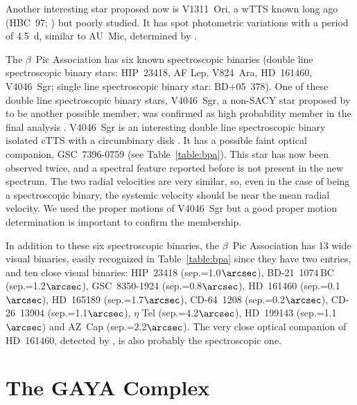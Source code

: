 \documentclass[11pt,twoside]{book}
\begin{document}
Another interesting star proposed now is V1311~Ori, a wTTS known long ago (HBC~97; \citep{hbc})
but poorly studied. It has spot photometric variations with a period of 4.5~d, similar
to AU~Mic, determined by \citet{gahm95}.

The $\beta$~Pic Association has six known spectroscopic binaries
(double line spectroscopic binary stars: HIP~23418, AF Lep,
V824~Ara, HD~161460, V4046~Sgr; single line spectroscopic binary star:
BD+05~378).  One of these double line spectroscopic binary stars,
V4046~Sgr, a non-SACY star proposed by \citet{torres03a, torres03} to
be another possible member, was confirmed as high probability member
in the final analysis \citep{torres06}.  V4046~Sgr is an interesting
double line spectroscopic binary isolated cTTS with a circumbinary
disk \citep{quast00, stempels04}.  It has a possible faint optical
companion, GSC~7396-0759 (see Table~\ref{table:bpa}).  This star has
now been observed twice, and a spectral feature reported before
\citep{torres06} is not present in the new spectrum.  The two radial
velocities are very similar, so, even in the case of being a
spectroscopic binary, the systemic velocity should be near the mean
radial velocity.  We used the proper motions of V4046~Sgr but a good
proper motion determination is important to confirm the membership.

In addition to these six spectroscopic binaries, the $\beta$~Pic
Association has 13 wide visual binaries, easily recognized in
Table~\ref{table:bpa} since they have two entries, and ten close
visual binaries: HIP~23418 (sep.=1.0$\arcsec$), BD-21~1074\,BC
(sep.=1.2$\arcsec$), GSC~8350-1924 (sep.=0.8$\arcsec$), HD~161460
(sep.=0.1$\arcsec$), HD~165189 (sep.=1.7$\arcsec$), CD-64~1208
(sep.=0.2$\arcsec$), CD-26~13904 (sep.=1.1$\arcsec$), $\eta$ Tel
(sep.=4.2$\arcsec$), HD~199143 (sep.=1.1$\arcsec$) and AZ~Cap
(sep.=2.2$\arcsec$).  The very close optical companion of HD~161460,
detected by \citet{nuria08a}, is also probably the spectroscopic one.


\section{The GAYA Complex}
\end{document}
